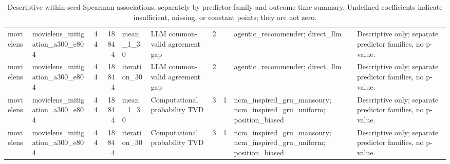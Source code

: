 \begin{table}[htbp!]
\begin{tabular}{llrrllrrll}
movielens & movielens\_mitigation\_a300\_e804 & 44 & 18844 & mean\_1\_30 & LLM common-valid agreement gap & 2 & \textemdash{} & agentic\_recommender; direct\_llm & Descriptive only; separate predictor families, no p-value. \\
movielens & movielens\_mitigation\_a300\_e804 & 44 & 18844 & iteration\_30 & LLM common-valid agreement gap & 2 & \textemdash{} & agentic\_recommender; direct\_llm & Descriptive only; separate predictor families, no p-value. \\
movielens & movielens\_mitigation\_a300\_e804 & 44 & 18844 & mean\_1\_30 & Computational probability TVD & 3 & 1 & ncm\_inspired\_gru\_mansoury; ncm\_inspired\_gru\_uniform; position\_biased & Descriptive only; separate predictor families, no p-value. \\
movielens & movielens\_mitigation\_a300\_e804 & 44 & 18844 & iteration\_30 & Computational probability TVD & 3 & 1 & ncm\_inspired\_gru\_mansoury; ncm\_inspired\_gru\_uniform; position\_biased & Descriptive only; separate predictor families, no p-value. \\
\hline
\end{tabular}
\caption{Descriptive within-seed Spearman associations, separately by predictor family and outcome time summary. Undefined coefficients indicate insufficient, missing, or constant points; they are not zero.}
\label{chap:results:tab:rq5_within_seed_associations}
\end{table}

